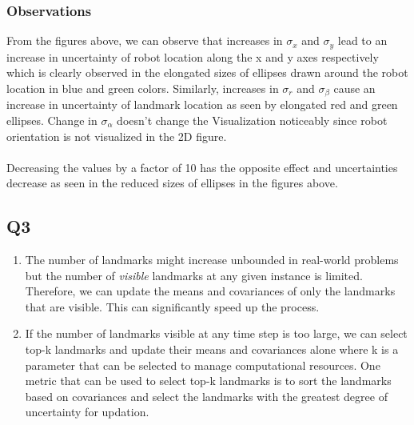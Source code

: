 \documentclass[12pt, a4paper]{article}
\begin{document}
\subsubsection{Observations}
From the figures above, we can observe that increases in $\sigma_x$ and $\sigma_y$ lead to an increase in uncertainty of robot location along the x and y axes respectively which is clearly observed in the elongated sizes of ellipses drawn around the robot location in blue and green colors. Similarly, increases in $\sigma_{r}$ and $\sigma_{\beta}$  cause an increase in uncertainty of landmark location as seen by elongated red and green ellipses. Change in $\sigma_{\alpha}$ doesn't change the Visualization noticeably since robot orientation is not visualized in the 2D figure.\\\\
Decreasing the values by a factor of 10 has the opposite effect and uncertainties decrease as seen in the reduced sizes of ellipses in the figures above.
\subsection{Q3}
\begin{enumerate}
  \item The number of landmarks might increase unbounded in real-world problems but the number of \textit{visible} landmarks at any given instance is limited. Therefore, we can update the means and covariances of only the landmarks that are visible. This can significantly speed up the process.
  \item If the number of landmarks visible at any time step is too large, we can select top-k landmarks and update their means and covariances alone where k is a parameter that can be selected to manage computational resources. One metric that can be used to select top-k landmarks is to sort the landmarks based on covariances and select the landmarks with the greatest degree of uncertainty for updation. 
\end{enumerate}
\end{document}
